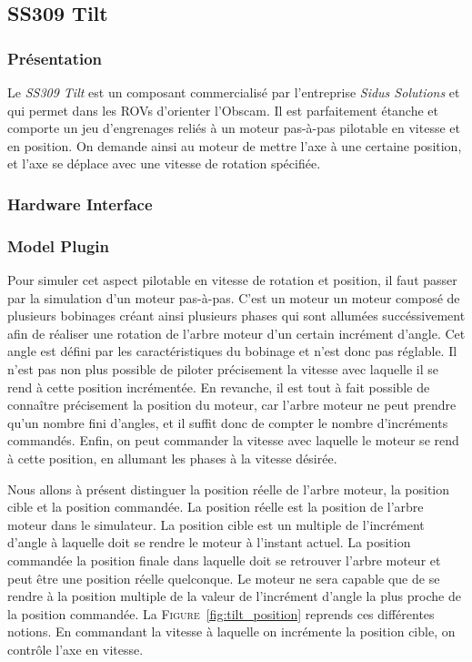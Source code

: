 		\subsection{SS309 Tilt}

			\subsubsection{Présentation}

				Le \textit{SS309 Tilt} est un composant commercialisé par l'entreprise \textit{Sidus Solutions} et qui permet dans les \gls{ROV}s d'orienter l'\gls{Obscam}. Il est parfaitement étanche et comporte un jeu d'engrenages reliés à un moteur pas-à-pas pilotable en vitesse et en position. On demande ainsi au moteur de mettre l'axe à une certaine position, et l'axe se déplace avec une vitesse de rotation spécifiée.
			
			\subsubsection{Hardware Interface}

			\subsubsection{Model Plugin}

				Pour simuler cet aspect pilotable en vitesse de rotation et position, il faut passer par la simulation d'un moteur pas-à-pas. C'est un moteur un moteur composé de plusieurs bobinages créant ainsi plusieurs phases qui sont allumées succéssivement afin de réaliser une rotation de l'arbre moteur d'un certain incrément d'angle. Cet angle est défini par les caractéristiques du bobinage et n'est donc pas réglable. Il n'est pas non plus possible de piloter précisement la vitesse avec laquelle il se rend à cette position incrémentée. En revanche, il est tout à fait possible de connaître précisement la position du moteur, car l'arbre moteur ne peut prendre qu'un nombre fini d'angles, et il suffit donc de compter le nombre d'incréments commandés. Enfin, on peut commander la vitesse avec laquelle le moteur se rend à cette position, en allumant les phases à la vitesse désirée.

				Nous allons à présent distinguer la position réelle de l'arbre moteur, la position cible et la position commandée. La position réelle est la position de l'arbre moteur dans le simulateur. La position cible est un multiple de l'incrément d'angle à laquelle doit se rendre le moteur à l'instant actuel. La position commandée la position finale dans laquelle doit se retrouver l'arbre moteur et peut être une position réelle quelconque. Le moteur ne sera capable que de se rendre à la position multiple de la valeur de l'incrément d'angle la plus proche de la position commandée. La \textsc{Figure}~\ref{fig:tilt_position} reprends ces différentes notions. En commandant la vitesse à laquelle on incrémente la position cible, on contrôle l'axe en vitesse.

